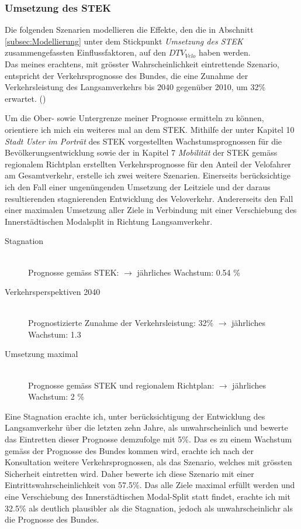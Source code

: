 \subsubsection*{Umsetzung des STEK}
\label{subsubsec:Umsetzung}

Die folgenden Szenarien modellieren die Effekte, den die in Abschnitt \ref{subsec:Modellierung} unter dem Stickpunkt \textit{Umsetzung des STEK} zusammengefassten Einflussfaktoren, auf den $DTV_{Velo}$ haben werden. \\

Das meines erachtens, mit grösster Wahrscheinlichkeit eintrettende Szenario, entspricht der Verkehrsprognosse des Bundes, die eine Zunahme der Verkehrsleistung des Langsamverkehrs bis 2040 gegenüber 2010, um 32\% erwartet. (\cite{Perspektive2040}) 

Um die Ober- sowie Untergrenze meiner Prognosse ermitteln zu können, orientiere ich mich ein weiteres mal an dem STEK. Mithilfe der unter Kapitel 10 \textit{Stadt Uster im Porträt} des STEK vorgestellten Wachstumsprognossen für die Bevölkerungsentwicklung sowie der in Kapitel 7 \textit{Mobilität} der STEK gemäss regionalem Richtplan erstellten Verkehrsprognosse für den Anteil der Velofahrer am Gesamtverkehr, erstelle ich zwei weitere Szenarien. 
Einerseits berücksichtige ich den Fall einer ungenüngenden Umsetzung der Leitziele und der daraus resultierenden stagnierenden Entwicklung des Veloverkehr. Andererseits den Fall einer maximalen Umsetzung aller Ziele in Verbindung mit einer Verschiebung des Innerstädtischen Modalsplit in Richtung Langsamverkehr.

\pagebreak

\begin{description}
\item[Stagnation] \hfill \\
Prognosse gemäss STEK: $\rightarrow$ jährliches Wachstum: 0.54 \% 
\item[Verkehrsperspektiven 2040] \hfill \\
Prognostizierte Zunahme der Verkehrsleistung: 32\% $\rightarrow$ jährliches Wachstum: 1.3 
\item[Umsetzung maximal] \hfill \\
Prognosse gemäss STEK und regionalem Richtplan: $\rightarrow$ jährliches Wachstum: 2 \% 
\end{description}

Eine Stagnation erachte ich, unter berücksichtigung der Entwicklung des Langsamverkehr über die letzten zehn Jahre, als unwahrscheinlich und bewerte das Eintretten dieser Prognosse demzufolge mit 5\%.
Das es zu einem Wachstum gemäss der Prognosse des Bundes kommen wird, erachte ich nach der Konsultation weitere Verkehrsprognossen, als das Szenario, welches mit grössten Sicherheit eintretten wird. Daher bewerte ich diese Szenario mit einer Eintrittswahrscheinlichkeit von 57.5\%. 
Das alle Ziele maximal erfüllt werden und eine Verschiebung des Innerstädtischen Modal-Split statt findet, erachte ich mit 32.5\% als deutlich plausibler als die Stagnation, jedoch als unwahrscheinlichr als die Prognosse des Bundes. 

